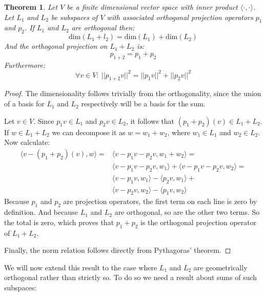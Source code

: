 \documentclass[12pt, a4paper]{article}
\newtheorem{theorem}{Theorem}[section]
\numberwithin{equation}{section}
\begin{document}
\begin{theorem}
\label{projection_lemma5}
Let $V$ be a finite dimensional vector space with inner product $\langle\cdot,\cdot\rangle$. Let $L_1$ and $L_2$ be subspaces of $V$ with associated orthogonal projection operators $p_1$ and $p_2$. If $L_1$ and $L_2$ are orthogonal then:
\begin{equation}
\textrm{dim}(L_1+l_2)=\textrm{dim}(L_1)+\textrm{dim}(L_2)
\end{equation}
And the orthogonal projection on $L_1+L_2$ is:
\begin{equation}
p_{1+2}=p_1+p_2
\end{equation}
Furthermore:
\begin{equation}
\forall v\in V:\ ||p_{1+2}v||^2=||p_1 v||^2+||p_2 v||^2
\end{equation}
\end{theorem}
\begin{proof}
The dimensionality follows trivially from the orthogonality, since the union of a basis for $L_1$ and $L_2$ respectively will be a basis for the sum.

Let $v\in V$. Since $p_1 v\in L_1$ and $p_2 v\in L_2$, it follows that $(p_1+p_2)(v)\in L_1+L_2$. If $w\in L_1+L_2$ we can decompose it as $w=w_1+w_2$, where $w_1\in L_1$ and $w_2\in L_2$. Now calculate:
\begin{align}
\langle v-(p_1+p_2)(v),w\rangle=&\langle v-p_1 v-p_2 v,w_1+w_2\rangle=\\
&\langle v-p_1 v-p_2 v,w_1\rangle+\langle v-p_1 v-p_2 v,w_2\rangle=\\
&\langle v-p_1 v,w_1\rangle-\langle p_2 v,w_1\rangle+\\
&\langle v-p_2 v,w_2\rangle-\langle p_1 v,w_2\rangle
\end{align}
Because $p_1$ and $p_2$ are projection operators, the first term on each line is zero by definition. And because $L_1$ and $L_2$ are orthogonal, so are the other two terms. So the total is zero, which proves that $p_1+p_2$ is the orthogonal projection operator of $L_1+L_2$.

Finally, the norm relation follows directly from Pythagoras' theorem.
\end{proof}

We will now extend this result to the case where $L_1$ and $L_2$ are geometrically orthogonal rather than strictly so. To do so we need a result about sums of such subspaces:
\end{document}
